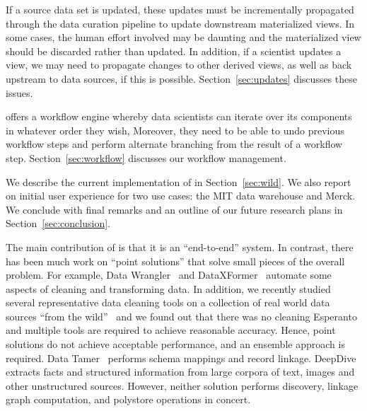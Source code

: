 \stitle{[Updates.]}  
If a source data set is updated, these updates must be incrementally propagated through the data curation pipeline to update downstream materialized views. 
In some cases, the human effort involved may be daunting and the materialized view should be discarded rather than updated. 
In addition, if a scientist updates a view, we may need to propagate changes to other derived views, as well as back upstream to data sources, if this is possible. Section~\ref{sec:updates} discusses these  issues.



\stitle{[Workflow.]} 
\dcv offers a workflow engine whereby data scientists can iterate over its components in whatever order they wish,  Moreover, they need to be able to undo previous workflow steps and perform alternate branching from the result of a workflow step.  Section~\ref{sec:workflow} discusses our workflow management.


We describe the current implementation of \dcv in Section~\ref{sec:wild}. We also report on initial user experience for two use cases: the MIT data warehouse and Merck. We conclude with final remarks and an outline of our future research plans in Section~\ref{sec:conclusion}.


The main contribution of \dcv is that it is an ``end-to-end'' system. In contrast, there has been much work on ``point solutions'' that solve small pieces of the overall problem. For example, Data Wrangler~\cite{2011-wrangler} and DataXFormer~\cite{DBLP:conf/icde/AbedjanMIOPS16} automate some aspects of cleaning and transforming data.
In addition, we recently studied several representative data cleaning tools on a collection of real world data sources ``from the wild''~\cite{DBLP:journals/pvldb/AbedjanCDFIOPST16} and we found out that there was no cleaning Esperanto and multiple tools are required to achieve reasonable accuracy.  
Hence, point solutions do not achieve acceptable performance, and an ensemble approach is required.
%
Data Tamer~\cite{DBLP:conf/cidr/StonebrakerBIBCZPX13} performs schema mappings and record linkage. DeepDive~\cite{DBLP:journals/pvldb/ShinWWSZR15} extracts facts and structured information from large corpora of text, images and other unstructured sources. However, neither solution performs  discovery, linkage graph computation, and polystore operations in concert.

